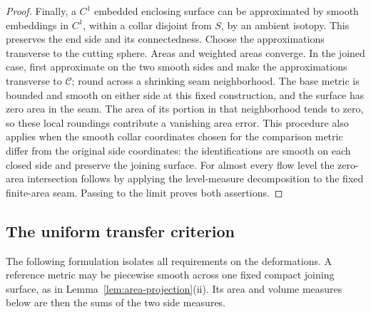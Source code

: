 \begin{proof}
Finally, a $C^1$ embedded enclosing surface can be approximated by
smooth embeddings in $C^1$, within a collar disjoint from $S$, by an
ambient isotopy.  This preserves the end side and its connectedness.
Choose the approximations transverse to the cutting sphere.  Areas
and weighted areas converge.  In the joined case, first approximate
on the two smooth sides and make the approximations transverse to
$\mathcal C$; round across a shrinking seam neighborhood.  The base
metric is bounded and smooth on either side at this fixed
construction, and the surface has zero area in the seam.  The area
of its portion in that neighborhood tends to zero, so these local
roundings contribute a vanishing area error.  This procedure also
applies when the smooth collar coordinates chosen for the comparison
metric differ from the original side coordinates: the
identifications are smooth on each closed side and preserve the
joining surface.  For almost every flow level the zero-area
intersection follows by applying the level-measure decomposition to
the fixed finite-area seam.  Passing to the limit proves both
assertions.
\end{proof}

\subsection{The uniform transfer criterion}

The following formulation isolates all requirements on the
deformations.  A reference metric may be piecewise smooth across one
fixed compact joining surface, as in
Lemma~\ref{lem:area-projection}\textup{(ii)}.  Its area and volume
measures below are then the sums of the two side measures.

